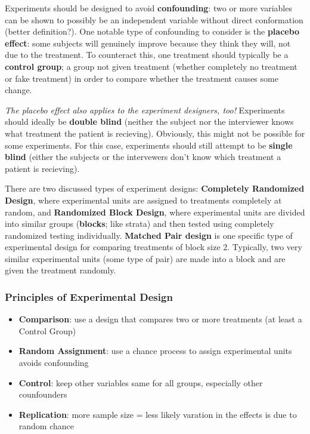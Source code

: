 \documentclass[12pt, a4paper]{article}
\theoremstyle{definition}
\begin{document}
Experiments should be designed to avoid \textbf{confounding}: two or more variables can be shown to possibly be an independent variable without direct conformation (better definition?).
One notable type of confounding to consider is the \textbf{placebo effect}: some subjects will genuinely improve because they think they will, not due to the treatment.
To counteract this, one treatment should typically be a \textbf{control group}; a group not given treatment (whether completely no treatment or fake treatment) in order to compare whether the treatment causes some change.

\textit{The placebo effect also applies to the experiment designers, too!}
Experiments should ideally be \textbf{double blind} (neither the subject nor the interviewer knows what treatment the patient is recieving).
Obviously, this might not be possible for some experiments.
For this case, experiments should still attempt to be \textbf{single blind} (either the subjects or the intervewers don't know which treatment a patient is recieving).

There are two discussed types of experiment designs: \textbf{Completely Randomized Design}, where experimental units are assigned to treatments completely at random, and \textbf{Randomized Block Design}, where experimental units are divided into similar groups (\textbf{blocks}; like strata) and then tested using completely randomized testing individually.
\textbf{Matched Pair design} is one specific type of experimental design for comparing treatments of block size 2.
Typically, two very similar experimental units (some type of pair) are made into a block and are given the treatment randomly.

\subsubsection{Principles of Experimental Design}
\begin{itemize}
    \item \textbf{Comparison}: use a design that compares two or more treatments (at least a Control Group)
    \item \textbf{Random Assignment}: use a chance process to assign experimental units avoids confounding
    \item \textbf{Control}: keep other variables same for all groups, especially other counfounders
    \item \textbf{Replication}: more sample size = less likely varation in the effects is due to random chance
\end{itemize}
\end{document}
